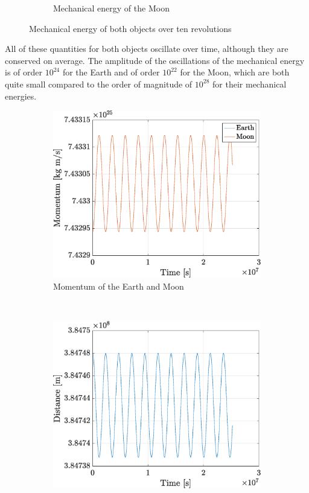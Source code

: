 \documentclass[a4paper,12pt,twoside]{article}
\begin{document}
\begin{figure}[h]
\begin{subfigure}[t]{0.48\textwidth}
    \caption{Mechanical energy of the Moon}
    \label{fig:emecl}
  \end{subfigure}
  \caption{Mechanical energy of both objects over ten revolutions}
  \label{fig:4emec}
\end{figure}

All of these quantities for both objects oscillate over time, although they are conserved on average. The amplitude of the oscillations of the mechanical energy is of order $10^{24}$ for the Earth and of order $10^{22}$ for the Moon, which are both quite small compared to the order of magnitude of $10^28$ for their mechanical energies.

\begin{figure}[h]
  \centering
  \begin{subfigure}[t]{0.48\textwidth}
    \includegraphics[width=\textwidth]{graphs/ex4b_p.eps}
    \caption{Momentum of the Earth and Moon}
    \label{fig:4p}
  \end{subfigure}
  ~
  \begin{subfigure}[t]{0.48\textwidth}
    \includegraphics[width=\textwidth]{graphs/ex4b_d.eps}

\end{subfigure}
\end{figure}
\end{document}
